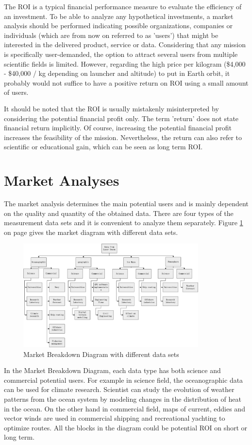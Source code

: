 The \ac{ROI} is a typical financial performance measure to evaluate the efficiency of an investment. To be able to analyze any hypothetical investments, a market analysis should be performed indicating possible organizations, companies or individuals (which are from now on referred to as 'users') that might be interested in the delivered product, service or data. Considering that any mission is specifically user-demanded, the option to attract several users from multiple scientific fields is limited. However, regarding the high price per kilogram (\$4,000 - \$40,000 / kg depending on launcher and altitude) to put in Earth orbit, it probably would not suffice to have a positive return on \acs{ROI} using a small amount of users. 

It should be noted that the \acs{ROI} is usually mistakenly misinterpreted by considering the potential financial profit only. The term 'return' does not state financial return implicitly. Of course, increasing the potential financial profit increases the feasibility of the mission. Nevertheless, the return can also refer to scientific or educational gain, which can be seen as long term \acs{ROI}. 

\section{Market Analyses}
  \label{blMAanalyses}
The market analysis determines the main potential users and is mainly dependent on the quality and quantity of the obtained data. There are four types of the measurement data sets and it is convenient to analyze them separately. Figure \ref{MA} on page \pageref{MA} gives the market diagram with different data sets.
\begin{figure} [h]
	\begin{center}
 \includegraphics[width=0.85\textwidth,angle=0]{chapters/img/Market_analysis.jpg}	
	\caption{Market Breakdown Diagram with different data sets\cite{Market}}
	\label{MA}
	\end{center}
\end{figure}
In the Market Breakdown Diagram, each data type has both science and commercial potential users. For example in science field, the oceanographic data can be used for climate research. Scientist can study the evolution of weather patterns from the ocean system by modeling changes in the distribution of heat in the ocean. On the other hand in commercial field, maps of current, eddies and vector winds are used in commercial shipping and recreational yachting to optimize routes. All the blocks in the diagram could be potential \acs{ROI} on short or long term.

